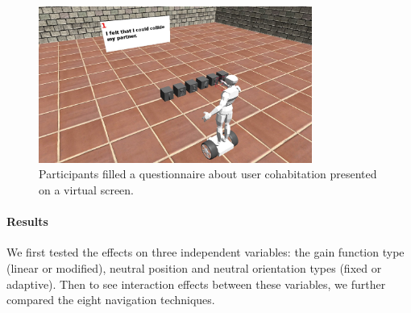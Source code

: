 \begin{figure}[tb]
  \centering
  \includegraphics[width=0.8\textwidth]{figures/3_t3_q}
  \caption{\label{fig:3_task3_q}Participants filled a questionnaire about user cohabitation presented on a virtual screen.}
\end{figure}


\paragraph{Results}
We first tested the effects on three independent variables: the gain function type (linear or modified), neutral position and neutral orientation types (fixed or adaptive). Then to see interaction effects between these variables, we further compared the eight navigation techniques.

